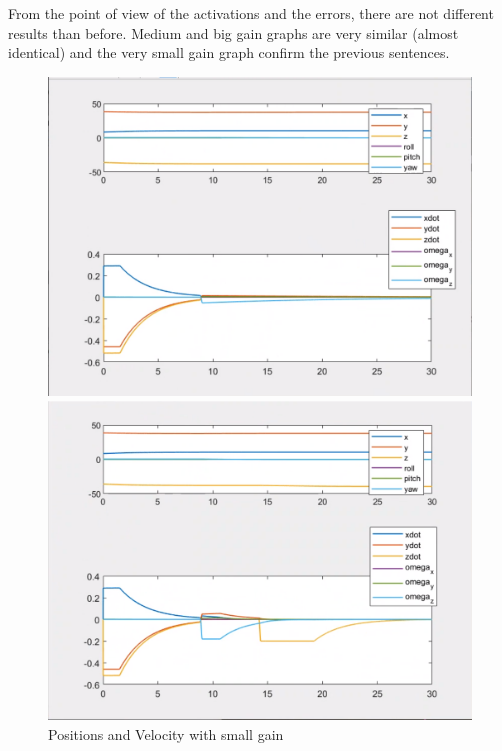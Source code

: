 \documentclass{article}
\begin{document}
From the point of view of the activations and the errors, there are not different results than before. Medium and big gain graphs are very similar (almost identical) and the very small gain graph confirm the previous sentences.
\begin{figure}[htpb] 
\begin{minipage}{0.40\textwidth}  
\includegraphics[width=\textwidth]{313_s_ppdot.png}
\caption{Positions and Velocity with small gain}\label{ppdot_w_s} 
\end{minipage}  
\hspace{0.2\textwidth} 
\begin{minipage}{0.40\textwidth}  
\includegraphics[width=\textwidth]{313_m_ppdot.png}

\end{minipage}
\end{figure}
\end{document}
